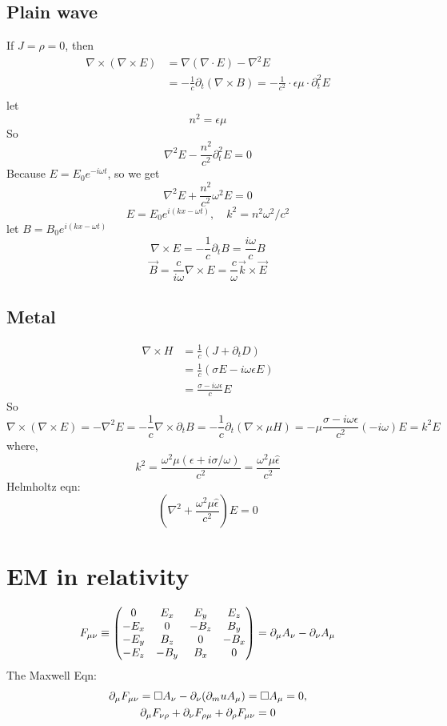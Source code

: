 \subsection{Plain wave}
If $J = \rho = 0$, then
\[
    \begin{aligned}
    \nabla\times(\nabla\times{E}) &= \nabla(\nabla\cdot{E}) - \nabla^{2}E \\
	&=-\frac{1}{c}\partial_{t}(\nabla\times{B})
	=-\frac{1}{c^2}\cdot\epsilon\mu\cdot\partial^2_{t}E \\
    \end{aligned}
    \]
let 
\[ n^2=\epsilon\mu \]
So
\[
    \nabla^2{E}-\frac{n^2}{c^2}\partial^2_{t}E = 0 
    \]
Because $E = E_0e^{-i\omega{t}}$, so we get
\[
    \nabla^2{E}+\frac{n^2}{c^2}\omega^2E = 0 
    \]
\[
    E = E_0e^{i(kx-\omega{t})}, \quad k^2 = n^2\omega^2/c^2
    \]
let $B = B_0e^{i(kx-\omega{t})}$
\[
    \nabla\times{E} = -\frac{1}{c}\partial_{t}B = \frac{i\omega}{c}B
    \]
\[
    \vec{B}=\frac{c}{i\omega}\nabla\times{E}=\frac{c}{\omega}\vec{k}\times{\vec{E}}
    \]

\subsection{Metal}
\[
    \begin{aligned}
    \nabla\times{H}&=\frac{1}{c}(J+\partial_{t}D)   \\
    &=\frac{1}{c}(\sigma{E}-i\omega\epsilon{E})	\\
    &=\frac{\sigma-i\omega\epsilon}{c}E
    \end{aligned}
\]
So 
\[
    \nabla\times(\nabla\times{E})=-\nabla^2{E}=-\frac{1}{c}\nabla\times\partial_{t}B
    =-\frac{1}{c}\partial_{t}(\nabla\times{{\mu}H})
    =-\mu\frac{\sigma-i\omega\epsilon}{c^2}(-i\omega)E
    =k^2E
    \]
where,
\[
    k^2=\frac{\omega^2\mu(\epsilon+i\sigma/\omega)}{c^2}=\frac{\omega^2\mu\hat{\epsilon}}{c^2}
    \]
Helmholtz eqn:
\[
    (\nabla^2+\frac{\omega^2\mu\hat{\epsilon}}{c^2})E=0
    \]



\section{EM in relativity}
\begin{equation}
    F_{\mu\nu} \equiv 
	\begin{pmatrix}
	    0	& E_x	& E_y	& E_z	\\
	    -E_x    & 0	& -B_z	& B_y	\\
	    -E_y    & B_z   & 0	& -B_x	\\
	    -E_z    & -B_y  & B_x   & 0	\\
	\end{pmatrix}
	= \partial_\mu A_\nu - \partial_\nu A_\mu
\end{equation}
The Maxwell Eqn:
\begin{gather}
    \partial_\mu F_{\mu\nu} = \Box A_\nu - \partial_\nu(\partial_mu A_\mu) =
    \Box A_\mu = 0, \notag\\
    \partial_\mu F_{\nu\rho} + \partial_\nu F_{\rho\mu} + \partial_\rho F_{\mu\nu} = 0
\end{gather}
